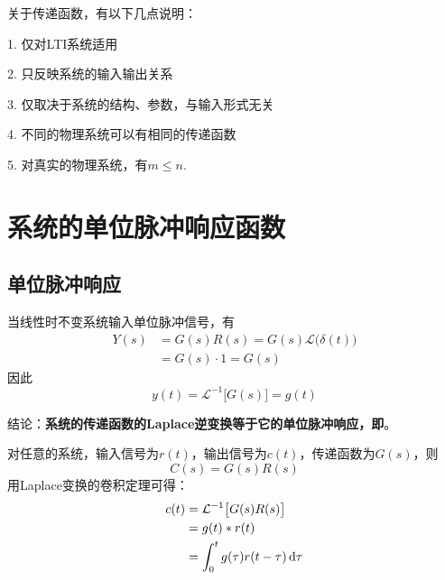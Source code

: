 \noindent 关于传递函数，有以下几点说明：
\begin{myitemize}
	\item 1. 仅对LTI系统适用\vspace*{-0.5em}
	\item 2. 只反映系统的输入输出关系\vspace*{-0.5em}
	\item 3. 仅取决于系统的结构、参数，与输入形式无关\vspace*{-0.5em}
	\item 4. 不同的物理系统可以有相同的传递函数\vspace*{-0.5em}
	\item 5. 对真实的物理系统，有$m \le n.$\vspace*{0.3em}
\end{myitemize}


\section{系统的单位脉冲响应函数}
\subsection{单位脉冲响应}
当线性时不变系统输入单位脉冲信号，有
\begin{equation*}
	\begin{split}
		Y(s) &= G(s)R(s) = G(s)\mathcal{L}\big(\delta(t)\big)\\
		&=G(s)\cdot 1=G(s)
	\end{split}
\end{equation*}
因此
\begin{equation}
	y(t) = \mathcal{L}^{-1}\big[G(s)\big]=g(t)
\end{equation}

结论：\textbf{系统的传递函数的Laplace逆变换等于它的单位脉冲响应，即}。

\noindent 对任意的系统，输入信号为$r(t)$，输出信号为$c(t)$，传递函数为$G(s)$，则
\begin{equation}
	C(s) = G(s)R(s)
\end{equation}
用Laplace变换的卷积定理可得：
\begin{equation}
	\begin{split}
		c(t) &= \mathcal{L}^{-1}\big[G(s)R(s)\big]\\
		& = g(t) * r(t)\\
		& = \int_0^t g(\tau)r(t-\tau) \,{\rm{d}} \tau
	\end{split}
\end{equation}

